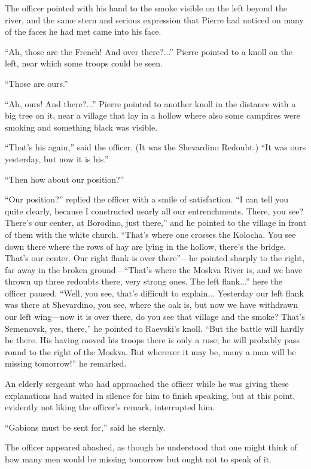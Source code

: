 The officer pointed with his hand to the smoke visible on the
left beyond the river, and the same stern and serious expression
that Pierre had noticed on many of the faces he had met came into
his face.

``Ah, those are the French! And over there?...'' Pierre pointed
to a knoll on the left, near which some troops could be seen.

``Those are ours.''

``Ah, ours! And there?...'' Pierre pointed to another knoll in
the distance with a big tree on it, near a village that lay in a
hollow where also some campfires were smoking and something black
was visible.

``That's his again,'' said the officer. (It was the Shevardino
Redoubt.)  ``It was ours yesterday, but now it is his.''

``Then how about our position?''

``Our position?'' replied the officer with a smile of
satisfaction. ``I can tell you quite clearly, because I
constructed nearly all our entrenchments. There, you see? There's
our center, at Borodino, just there,'' and he pointed to the
village in front of them with the white church. ``That's where
one crosses the Kolocha. You see down there where the rows of hay
are lying in the hollow, there's the bridge. That's our
center. Our right flank is over there''---he pointed sharply to
the right, far away in the broken ground---``That's where the
Moskva River is, and we have thrown up three redoubts there, very
strong ones. The left flank...'' here the officer paused. ``Well,
you see, that's difficult to explain... Yesterday our left flank
was there at Shevardino, you see, where the oak is, but now we
have withdrawn our left wing---now it is over there, do you see
that village and the smoke? That's Semenovsk, yes, there,'' he
pointed to Raevski's knoll. ``But the battle will hardly be
there. His having moved his troops there is only a ruse; he will
probably pass round to the right of the Moskva. But wherever it
may be, many a man will be missing tomorrow!'' he remarked.

An elderly sergeant who had approached the officer while he was
giving these explanations had waited in silence for him to finish
speaking, but at this point, evidently not liking the officer's
remark, interrupted him.

``Gabions must be sent for,'' said he sternly.

The officer appeared abashed, as though he understood that one
might think of how many men would be missing tomorrow but ought
not to speak of it.

